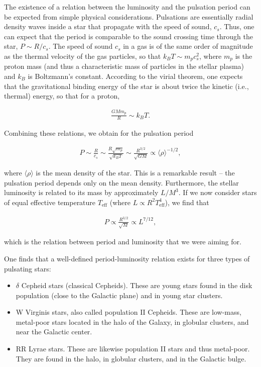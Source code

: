 \documentclass[a4paper,11pt]{article}
\begin{document}
{\noindent}The existence of a relation between the luminosity and the pulsation period can be expected from simple physical considerations. Pulsations are essentially radial density waves inside a star that propagate with the speed of sound, $c_s$. Thus, one can expect that the period is comparable to the sound crossing time through the star, $P\sim R/c_s$. The speed of sound $c_s$ in a gas is of the same order of magnitude as the thermal velocity of the gas particles, so that $k_BT\sim m_pc_s^2$, where $m_p$ is the proton mass (and thus a characteristic mass of particles in the stellar plasma) and $k_B$ is Boltzmann's constant. According to the virial theorem, one expects that the gravitational binding energy of the star is about twice the kinetic (i.e., thermal) energy, so that for a proton,

\begin{align*}
    \frac{GMm_p}{R} \sim k_BT.
\end{align*}

{\noindent}Combining these relations, we obtain for the pulsation period

\begin{align*}
    P\sim\frac{R}{c_s}\sim\frac{R\sqrt{m_p}}{\sqrt{k_BT}} \sim\frac{R^{3/2}}{\sqrt{GM}} \propto \langle\rho\rangle^{-1/2},
\end{align*}

{\noindent}where $\langle\rho\rangle$ is the mean density of the star. This is a remarkable result -- the pulsation period depends only on the mean density. Furthermore, the stellar luminosity is related to its mass by approximately $L/M^3$. If we now consider stars of equal effective temperature $T_\mathrm{eff}$ (where $L\propto R^2T_\mathrm{eff}^4$), we find that

\begin{align*}
    P \propto \frac{R^{3/2}}{\sqrt{M}} \propto L^{7/12},
\end{align*}

{\noindent}which is the relation between period and luminosity that we were aiming for.

{\noindent}One finds that a well-defined period-luminosity relation exists for three types of pulsating stars:

\begin{itemize}
    \item $\delta$ Cepheid stars (classical Cepheids). These are young stars found in the disk population (close to the Galactic plane) and in young star clusters.
    \item W Virginis stars, also called population II Cepheids. These are low-mass, metal-poor stars located in the halo of the Galaxy, in globular clusters, and near the Galactic center.
    \item RR Lyrae stars. These are likewise population II stars and thus metal-poor. They are found in the halo, in globular clusters, and in the Galactic bulge.
\end{itemize}
\end{document}
